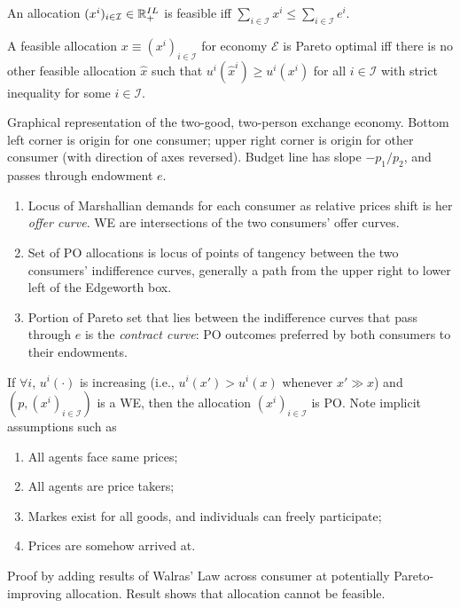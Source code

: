 \documentclass[8pt,letterpaper, landscape]{extarticle} %
\begin{document}
\begin{multicols}{3}
\begin{description}
 An allocation $ (x^i)_{i \in \mathcal{I}} \in \mathbb{R}^{IL}_+ $ is feasible iff $ \sum_{i \in \mathcal{I}} x^i \leq \sum_{i \in \mathcal{I}} e^i $.

 A feasible allocation $ x \equiv (x^i)_{i \in \mathcal{I}} $ for economy $ \mathcal{E} $ is Pareto optimal iff there is no other feasible allocation $ \hat{x} $ such that $ u^i(\hat{x}^i) \geq u^i(x^i) $ for all $ i \in \mathcal{I} $ with strict inequality for some $ i \in \mathcal{I} $.

 Graphical representation of the two-good, two-person exchange economy. Bottom left corner is origin for one consumer; upper right corner is origin for other consumer (with direction of axes reversed). Budget line has slope $ - p_1 / p_2 $, and passes through endowment $ e $.
\begin{enumerate}
\item Locus of Marshallian demands for each consumer as relative prices shift is her \textit{offer curve}. WE are intersections of the two consumers' offer curves.
\item Set of PO allocations is locus of points of tangency between the two consumers' indifference curves, generally a path from the upper right to lower left of the Edgeworth box.
\item Portion of Pareto set that lies between the indifference curves that pass through $ e $ is the \textit{contract curve}: PO outcomes preferred by both consumers to their endowments.
\end{enumerate}

 If $ \forall i $, $ u^i (\cdot) $ is increasing (i.e., $ u^i(x') > u^i(x) $ whenever $ x' \gg x $) and $ (p, (x^i)_{i \in \mathcal{I}}) $ is a WE, then the allocation $ (x^i)_{i \in \mathcal{I}} $ is PO. Note implicit assumptions such as
\begin{enumerate}
\item All agents face same prices;
\item All agents are price takers;
\item Markes exist for all goods, and individuals can freely participate;
\item Prices are somehow arrived at.
\end{enumerate}

Proof by adding results of Walras' Law across consumer at potentially Pareto-improving allocation. Result shows that allocation cannot be feasible.


\end{description}
\end{multicols}
\end{document}
